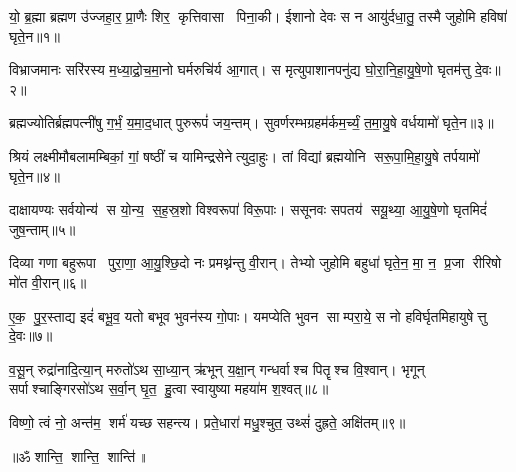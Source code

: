 

यो॒ ब्र॒ह्मा ब्रह्मण उ॑ज्जहा॒र॒ प्रा॒णैः शिर॒ कृत्तिवासा पिना॒की।
ईशानो देवः स न आयु॑र्दधा॒तु॒ तस्मै जुहोमि हविषा॑ घृते॒न॥१॥

विभ्राजमानः सरि॑रस्य म॒ध्या॒द्रो॒च॒मा॒नो घर्मरुचि॑र्य आ॒गात्।
स मृत्युपाशानपनु॑द्य घो॒रा॒नि॒हा॒यु॒षे॒णो घृतम॑त्तु दे॒वः॥२॥

ब्रह्मज्योतिर्ब्रह्मपत्नी॑षु  ग॒र्भं॒ य॒मा॒द॒धात् पुरुरूपं॑ जय॒न्तम्।
सुवर्णरम्भग्रहम॑र्कम॒र्च्यं॒ त॒मा॒यु॒षे वर्धयामो॑ घृते॒न॥३॥

श्रियं लक्ष्मीमौबलामम्बिकां॒ गां॒ षष्ठीं च यामिन्द्रसेनेत्युदा॒हुः।
तां विद्यां ब्रह्मयोनि सरू॒पा॒मि॒हा॒यु॒षे तर्पयामो॑ घृते॒न॥४॥

दाक्षायण्यः सर्वयोन्य॑ स यो॒न्य॒ स॒ह॒स्र॒शो विश्वरूपा॑ विरू॒पाः।
ससूनवः सपतय॑ सयू॒थ्या॒ आ॒यु॒षे॒णो घृतमिदं॑ जुष॒न्ताम्॥५॥

दिव्या गणा बहुरूपा पुरा॒णा॒ आ॒यु॒श्छि॒दो नः प्रमथ्न॑न्तु वी॒रान्।
तेभ्यो जुहोमि बहुधा॑ घृते॒न॒ मा॒ न॒ प्र॒जा रीरिषो मो॑त वी॒रान्॥६॥

ए॒क॒ पु॒र॒स्ताद्य इदं॑ बभू॒व॒ यतो बभूव भुवन॑स्य गो॒पाः।
यमप्येति भुवन साम्परा॒ये॒ स नो हविर्घृतमिहायुषेत्तु दे॒वः॥७॥

व॒सू॒न् रुद्रा॑नादि॒त्या॒न् मरुतो॑ऽथ सा॒ध्या॒न् ऋ॑भून् य॒क्षा॒न् गन्धर्वाश्च पितॄश्च वि॒श्वान्।
 भृगून् सर्पाश्चाङ्गिरसो॑ऽथ स॒र्वा॒न् घृ॒त॒ हु॒त्वा स्वायुष्या महया॑म श॒श्वत्॥८॥

विष्णो॒ त्वं नो॒ अन्त॑म॒ शर्म॑ यच्छ सहन्त्य।
प्रते॒धारा॑ मधु॒श्चुत॒ उथ्सं॑ दुह्रते॒ अक्षि॑तम्॥९॥

\centerline{॥ॐ शान्ति॒ शान्ति॒ शान्ति॑॥}